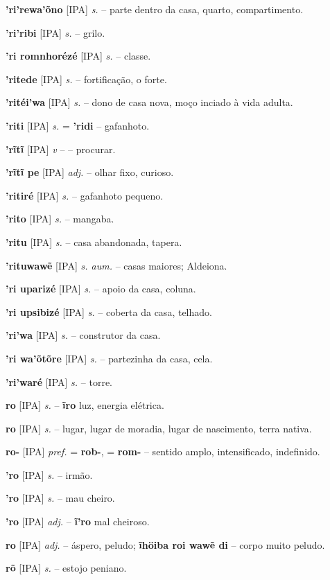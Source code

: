 \textbf{'ri'rewa'õno} [IPA] \textit{s.} -- parte dentro da casa, quarto, compartimento.

\textbf{'ri'ribi} [IPA] \textit{s.} -- grilo.

\textbf{'ri romnhorézé} [IPA] \textit{s.} -- classe.

\textbf{'ritede} [IPA] \textit{s.} -- fortificação, o forte.

\textbf{'ritéi'wa} [IPA] \textit{s.} -- dono de casa nova, moço inciado à vida adulta.

\textbf{'riti} [IPA] \textit{s.} = \textbf{'ridi} -- gafanhoto.

\textbf{'rĩtĩ} [IPA] \textit{v} -- -- procurar.

\textbf{'rĩtĩ pe} [IPA] \textit{adj.} -- olhar fixo, curioso.

\textbf{'ritiré} [IPA] \textit{s.} -- gafanhoto pequeno.

\textbf{'rito} [IPA] \textit{s.} -- mangaba.

\textbf{'ritu} [IPA] \textit{s.} -- casa abandonada, tapera.

\textbf{'rituwawẽ} [IPA] \textit{s. aum.} -- casas maiores; Aldeiona.

\textbf{'ri uparizé} [IPA] \textit{s.} -- apoio da casa, coluna.

\textbf{'ri upsibizé} [IPA] \textit{s.} -- coberta da casa, telhado.

\textbf{'ri'wa} [IPA] \textit{s.} -- construtor da casa.

\textbf{'ri wa'õtõre} [IPA] \textit{s.} -- partezinha da casa, cela.

\textbf{'ri'waré} [IPA] \textit{s.} -- torre.

\textbf{ro} [IPA] \textit{s.} -- \textbf{ĩro} luz, energia elétrica.

\textbf{ro} [IPA] \textit{s.} -- lugar, lugar de moradia, lugar de nascimento, terra nativa.

\textbf{ro-} [IPA] \textit{pref.} = \textbf{rob-}, = \textbf{rom-} -- sentido amplo, intensificado, indefinido.

\textbf{'ro} [IPA] \textit{s.} -- irmão.

\textbf{'ro} [IPA] \textit{s.} -- mau cheiro.

\textbf{'ro} [IPA] \textit{adj.} -- \textbf{ĩ'ro} mal cheiroso.

\textbf{ro} [IPA] \textit{adj.} -- áspero, peludo; \textbf{ĩhöiba roi wawẽ di} -- corpo muito peludo.

\textbf{rõ} [IPA] \textit{s.} -- estojo peniano.

